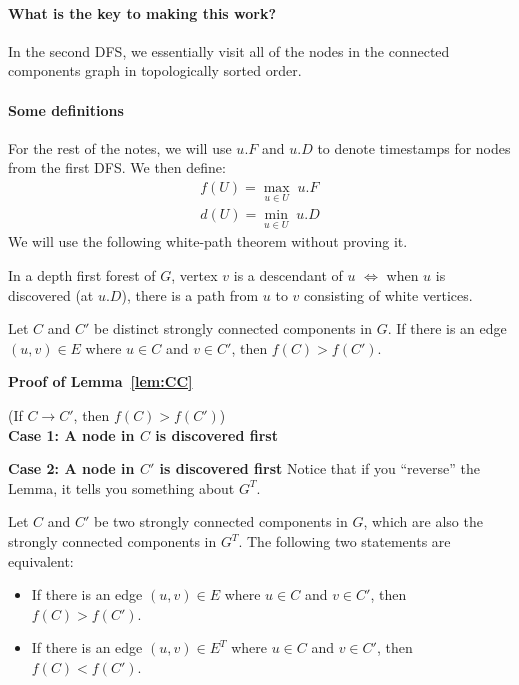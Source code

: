 \documentclass[11  pt]{exam}
\begin{document}
	\paragraph{What is the key to making this work?}
	In the second DFS, we essentially visit all of the nodes in the connected components graph in topologically sorted order.
	
	
	\vs{3cm}
	\paragraph{Some definitions}
	For the rest of the notes, we will use $u.F$ and $u.D$ to denote timestamps for nodes from the first DFS. We then define:
	\begin{align*}
		f(U) = \max_{u \in U} \; u.F \\
		d(U) = \min_{u \in U} \; u.D
	\end{align*}
	We will use the following white-path theorem without proving it.
	\begin{theorem}
		In a depth first forest of $G$, vertex $v$ is a descendant of $u$ $\iff$ when $u$ is discovered (at $u.D$), there is a path from $u$ to $v$ consisting of white vertices.
	\end{theorem}
	\vs{2cm}
	
	\begin{lemma}
		\label{lem:CC}
		Let $C$ and $C'$ be distinct strongly connected components in $G$. If there is an edge $(u,v) \in E$ where $u \in C$ and $v \in C'$, then $f(C) > f(C')$.
	\end{lemma}
	
	\newpage
	\textbf{Proof of Lemma~\ref{lem:CC}}
	
	(If $C \rightarrow C'$, then $f(C) > f(C')$)\\
	
	
	\textbf{Case 1: A node in $C$ is discovered first}
	
	\vfill
	
	\textbf{Case 2: A node in $C'$ is discovered first}
	\vfill
	\newpage
	Notice that if you ``reverse'' the Lemma, it tells you something about $G^T$. 
	
	
	Let $C$ and $C'$ be two strongly connected components in $G$, which are also the strongly connected components in $G^T$. The following two statements are equivalent:
	\begin{itemize}
		\item If there is an edge $(u,v) \in E$ where $u \in C$ and $v \in C'$, then $f(C) > f(C')$.\\
		\item If there is an edge $(u,v) \in E^T$ where $u \in C$ and $v \in C'$, then $f(C) < f(C')$.\\
	\end{itemize}
	
\end{document}
